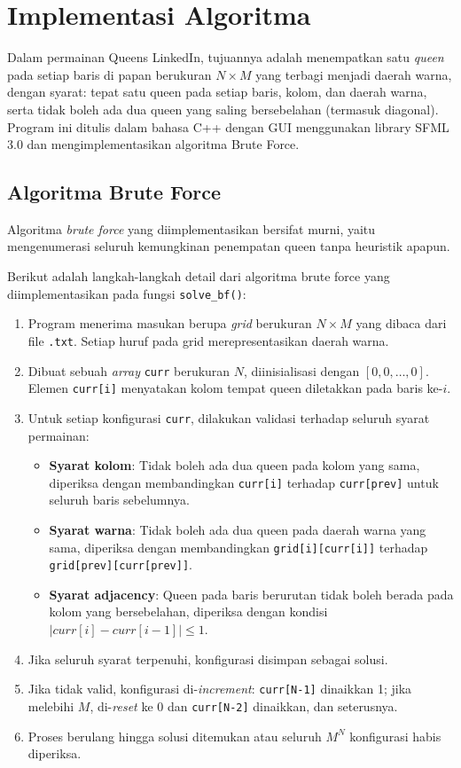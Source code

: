 \chapter{Implementasi Algoritma}

Dalam permainan Queens LinkedIn, tujuannya adalah menempatkan satu \textit{queen} pada setiap baris di papan berukuran $N \times M$ yang terbagi menjadi daerah warna, dengan syarat: tepat satu queen pada setiap baris, kolom, dan daerah warna, serta tidak boleh ada dua queen yang saling bersebelahan (termasuk diagonal). Program ini ditulis dalam bahasa C++ dengan GUI menggunakan library SFML 3.0 dan mengimplementasikan algoritma Brute Force.

\section{Algoritma Brute Force}

Algoritma \textit{brute force} yang diimplementasikan bersifat murni, yaitu mengenumerasi seluruh kemungkinan penempatan queen tanpa heuristik apapun.

Berikut adalah langkah-langkah detail dari algoritma brute force yang diimplementasikan pada fungsi \texttt{solve\_bf()}:

\begin{enumerate}
    \item Program menerima masukan berupa \textit{grid} berukuran $N \times M$ yang dibaca dari file \texttt{.txt}. Setiap huruf pada grid merepresentasikan daerah warna.
    \item Dibuat sebuah \textit{array} \texttt{curr} berukuran $N$, diinisialisasi dengan $[0, 0, \dots, 0]$. Elemen \texttt{curr[i]} menyatakan kolom tempat queen diletakkan pada baris ke-$i$.
    \item Untuk setiap konfigurasi \texttt{curr}, dilakukan validasi terhadap seluruh syarat permainan:
    \begin{itemize}
        \item \textbf{Syarat kolom}: Tidak boleh ada dua queen pada kolom yang sama, diperiksa dengan membandingkan \texttt{curr[i]} terhadap \texttt{curr[prev]} untuk seluruh baris sebelumnya.
        \item \textbf{Syarat warna}: Tidak boleh ada dua queen pada daerah warna yang sama, diperiksa dengan membandingkan \texttt{grid[i][curr[i]]} terhadap \texttt{grid[prev][curr[prev]]}.
        \item \textbf{Syarat adjacency}: Queen pada baris berurutan tidak boleh berada pada kolom yang bersebelahan, diperiksa dengan kondisi $|curr[i] - curr[i-1]| \leq 1$.
    \end{itemize}
    \item Jika seluruh syarat terpenuhi, konfigurasi disimpan sebagai solusi.
    \item Jika tidak valid, konfigurasi di-\textit{increment}: \texttt{curr[N-1]} dinaikkan 1; jika melebihi $M$, di-\textit{reset} ke 0 dan \texttt{curr[N-2]} dinaikkan, dan seterusnya.
    \item Proses berulang hingga solusi ditemukan atau seluruh $M^N$ konfigurasi habis diperiksa.
\end{enumerate}

